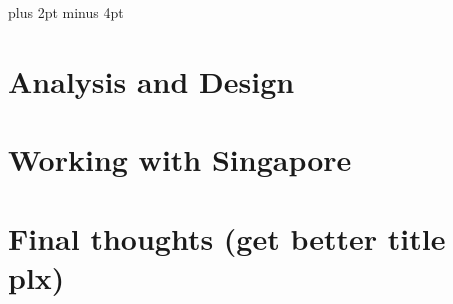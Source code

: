 \documentclass[a4paper,titlepage]{article}
\begin{document}
\parindent=0pt %
\parskip=8pt plus 2pt minus 4pt

\setcounter{page}{1}



\tableofcontents
\newpage

\begin{spacing}{1.15}

\pagebreak

\section{Analysis and Design}







\pagebreak
\section{Working with Singapore}

\pagebreak

\section{Final thoughts (get better title plx)}

\end{spacing}
\pagebreak


\newpage
{}
\appendix
{}

\end{document}
